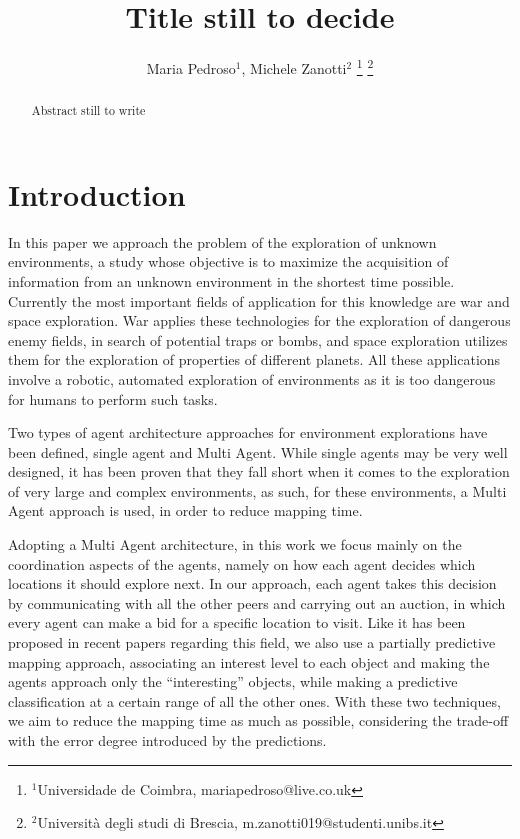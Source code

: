 \documentclass[a4paper, 10pt, conference]{ieeeconf}      %
\title{\LARGE \bf
Title still to decide
}
\author{Maria Pedroso$^{1}$, Michele Zanotti$^{2}$%
\thanks{$^{1}$Universidade de Coimbra, mariapedroso@live.co.uk}%
\thanks{$^{2}$Università degli studi di Brescia, m.zanotti019@studenti.unibs.it}%
}
\begin{document}
\maketitle
\thispagestyle{empty}
\pagestyle{empty}


\begin{abstract}

Abstract still to write

\end{abstract}


\section{Introduction}
In this paper we approach the problem of the exploration of unknown environments, a study whose objective is to maximize the acquisition of information from an unknown environment in the shortest time possible. Currently the most important fields of application for this knowledge are war and space exploration. War applies these technologies for the exploration of dangerous enemy fields, in search of potential traps or bombs, and space exploration utilizes them for the exploration of properties of different planets. All these applications involve a robotic, automated exploration of environments as it is too dangerous for humans to perform such tasks.

Two types of agent architecture approaches for environment explorations have been defined, single agent and Multi Agent. While single agents may be very well designed, it has been proven that they fall short when it comes to the exploration of very large and complex environments, as such, for these environments, a Multi Agent approach is used, in order to reduce mapping time. 

Adopting a Multi Agent architecture, in this work we focus mainly on the coordination aspects of the agents, namely on how each agent decides which locations it should explore next. In our approach, each agent takes this decision by communicating with all the other peers and carrying out an auction, in which every agent can make a bid for a specific location to visit. Like it has been proposed in recent papers regarding this field, we also use a partially predictive mapping approach, associating an interest level to each object and making the agents approach only the ``interesting'' objects, while making a predictive classification at a certain range of all the other ones. With these two techniques, we aim to reduce the mapping time as much as possible, considering the trade-off with the error degree introduced by the predictions. 
\end{document}

